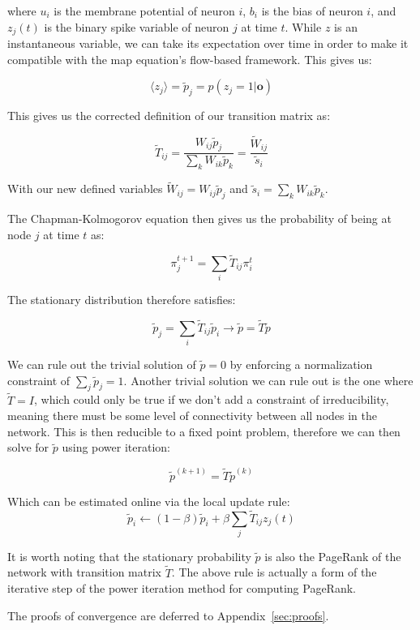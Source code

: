 \documentclass[pdflatex,sn-mathphys-num]{sn-jnl}%
\theoremstyle{thmstyleone}%
\theoremstyle{thmstyletwo}%
\theoremstyle{thmstylethree}%
\begin{document}
where $u_i$ is the membrane potential of neuron $i$, $b_i$ is the bias of neuron $i$, and $z_j(t)$ is the binary spike variable of neuron $j$ at time $t$. While $z$ is an instantaneous variable, we can take its expectation over time in order to make it compatible with the map equation's flow-based framework. This gives us:

$$\langle z_j \rangle = \tilde{p}_j = p(z_j = 1 | \mathbf{o})$$

This gives us the corrected definition of our transition matrix as:

$$\tilde{T}_{ij} = \frac{W_{ij} \tilde{p}_j}{\sum_k W_{ik} \tilde{p}_k} = \frac{\tilde{W}_{ij}}{\tilde{s}_i}$$

With our new defined variables $\tilde{W}_{ij} = W_{ij} \tilde{p}_j$ and $\tilde{s}_i = \sum_k W_{ik} \tilde{p}_k$.

The Chapman-Kolmogorov equation then gives us the probability of being at node $j$ at time $t$ as:

$$\pi_j^{t+1} = \sum_i \tilde{T}_{ij}\pi_i^t$$

The stationary distribution therefore satisfies:

$$\tilde{p}_j = \sum_i \tilde{T}_{ij} \tilde{p}_i\rightarrow \tilde{p} = \tilde{T} \tilde{p}$$

We can rule out the trivial solution of $\tilde{p} = 0$ by enforcing a normalization constraint of $\sum_j \tilde{p}_j = 1$. Another trivial solution we can rule out is the one where $\tilde{T}=I$, which could only be true if we don't add a constraint of irreducibility, meaning there must be some level of connectivity between all nodes in the network. This is then reducible to a fixed point problem, therefore we can then solve for $\tilde{p}$ using power iteration:

$$\tilde{p}^{(k+1)} = \tilde{T} \tilde{p}^{(k)}$$

Which can be estimated online via the local update rule:
\begin{equation}
\tilde{p}_i \leftarrow (1-\beta) \tilde{p}_i + \beta \sum_j \tilde{T}_{ij} z_j(t)
\label{eq:local-update}
\end{equation}

It is worth noting that the stationary probability $\tilde{p}$ is also the PageRank of the network with transition matrix $\tilde{T}$. The above rule is actually a form of the iterative step of the power iteration method for computing PageRank.

The proofs of convergence are deferred to Appendix~\ref{sec:proofs}.
\end{document}
